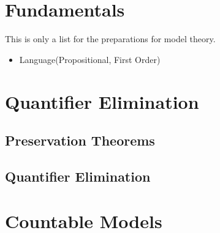 \documentclass[Total.tex]{subfiles}
\begin{document}
	\chapter{Fundamentals}
	
		This is only a list for the preparations for model theory. 
		\begin{itemize}
			\item Language(Propositional, First Order)
		\end{itemize}
	\chapter{Quantifier Elimination}
		\section{Preservation Theorems}
		\section{Quantifier Elimination}
		
	\chapter{Countable Models}
\end{document}
